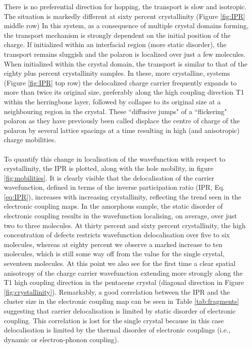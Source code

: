 There is no preferential direction for hopping, the transport is slow and isotropic. The situation is markedly different at sixty percent crystallinity (Figure \ref{fig:IPR} middle row)
In this system, as a consequence of multiple crystal domains forming, the transport mechanism is strongly dependent on the initial position of the charge. If initialized within an interfacial region (more static disorder), the transport remains sluggish and the polaron is localized over just a few molecules. When initialized within the crystal domain, the transport is similar to that of the eighty plus percent crystallinity samples. In these, more crystalline, systems (Figure \ref{fig:IPR} top row)
the delocalized charge carrier frequently expands to more than twice its original size, preferably along the high coupling direction T1 within the herringbone layer, followed by collapse to its
original size at a neighbouring region in the crystal.  These ``diffusive jumps" of a ``flickering" polaron as they have previously been called \cite{FlickPolarons, Giannini2019}
displace the centre of charge of the polaron by several lattice spacings at a time resulting in high (and anisotropic) charge mobilities.
\\\\
To quantify this change in localisation of the wavefunction with respect to crystallinity, the IPR is plotted, along with the hole mobility, in figure \ref{fig:mobilities}. It is clearly visible that the delocalisation of the carrier wavefunction, defined in terms of the inverse participation ratio (IPR, Eq. \eqref{eq:IPR}), increases with increasing crystallinity, reflecting the trend seen in the electronic coupling maps. In the amorphous sample, the static disorder of electronic coupling results in the wavefunction localising, on average, over just two to three molecules. At thirty percent and sixty percent crystallinity, the high concentration of defects restricts wavefunction delocalisation over five to six molecules, whereas at eighty percent we observe a marked increase to ten molecules, which is still some way off from the value for the single crystal, seventeen molecules.  At this point we also see for the first time a clear spatial anisotropy of the charge carrier wavefunction extending more strongly along the T1 high coupling direction in the pentacene crystal (diagonal direction in Figure \ref{fig:crystallinity}). Remarkably, a good correlation between the IPR and the cluster size in the electronic coupling map can be seen in Table \ref{tab:fragments} suggesting that carrier delocalisation is limited by static disorder of electronic coupling. This correlation is lost for the single crystal because in this case delocalisation is limited by the thermal disorder of electronic couplings (i.e., dynamic or electron-phonon coupling). 

